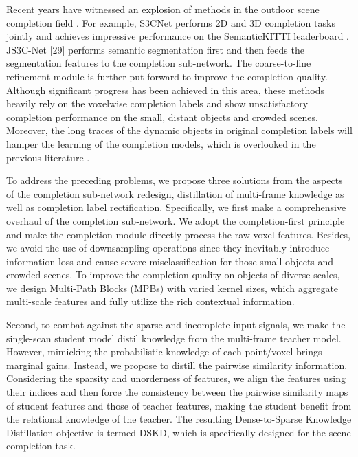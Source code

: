 \documentclass[10pt,twocolumn,letterpaper]{article}
\begin{document}
Recent years have witnessed an explosion of methods in the outdoor scene completion field \cite{diederikpkingma2015,yuenanhou2017,fredtungandgregmori,yuenanhou2022}. For example, S3CNet \cite{diederikpkingma2015} performs 2D and 3D completion tasks jointly and achieves impressive performance on the SemanticKITTI leaderboard \cite{zehaohuang}. JS3C-Net [29] performs semantic segmentation first and then feeds the segmentation features to the completion sub-network. The coarse-to-fine refinement module is further put forward to improve the completion quality. Although significant progress has been achieved in this area, these methods heavily rely on the voxelwise completion labels and show unsatisfactory completion performance on the small, distant objects and crowded scenes. Moreover, the long traces of the dynamic objects in original completion labels will hamper the learning of the completion models, which is overlooked in the previous literature \cite{haotiantang2020}.

To address the preceding problems, we propose three solutions from the aspects of the completion sub-network redesign, distillation of multi-frame knowledge as well as completion label rectification. Specifically, we first make a comprehensive overhaul of the completion sub-network. We adopt the completion-first principle and make the completion module directly process the raw voxel features. Besides, we avoid the use of downsampling operations since they inevitably introduce information loss and cause severe misclassification for those small objects and crowded scenes. To improve the completion quality on objects of diverse scales, we design Multi-Path Blocks (MPBs) with varied kernel sizes, which aggregate multi-scale features and fully utilize the rich contextual information.

Second, to combat against the sparse and incomplete input signals, we make the single-scan student model distil knowledge from the multi-frame teacher model. However, mimicking the probabilistic knowledge of each point/voxel brings marginal gains. Instead, we propose to distill the pairwise similarity information. Considering the sparsity and unorderness of features, we align the features using their indices and then force the consistency between the pairwise similarity maps of student features and those of teacher features, making the student benefit from the relational knowledge of the teacher. The resulting Dense-to-Sparse Knowledge Distillation objective is termed DSKD, which is specifically designed for the scene completion task.
\end{document}
